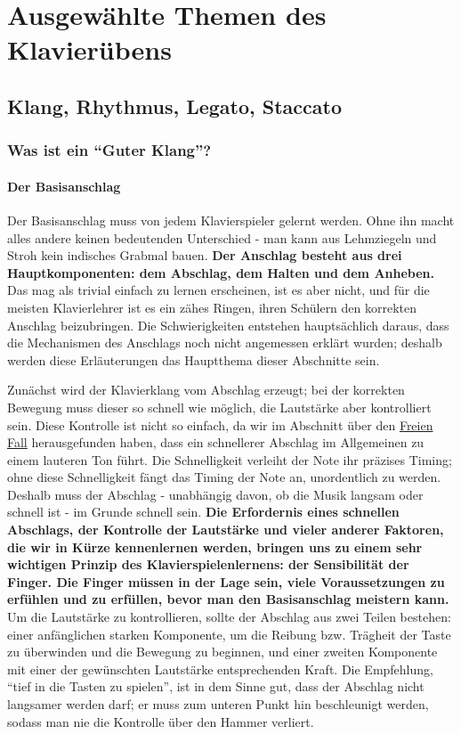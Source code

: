 
\chapter{Ausgewählte Themen des Klavierübens}
\label{c1iii1}


\section{Klang, Rhythmus, Legato, Staccato}

\subsection{Was ist ein \enquote{Guter Klang}?}
\label{c1iii1a}

\subsubsection{Der Basisanschlag}
\label{c1iii1a1}

Der Basisanschlag muss von jedem Klavierspieler gelernt werden.
Ohne ihn macht alles andere keinen bedeutenden Unterschied - man kann aus Lehmziegeln und Stroh kein indisches Grabmal bauen.
\textbf{Der Anschlag besteht aus drei Hauptkomponenten: dem Abschlag, dem Halten und dem Anheben.}
Das mag als trivial einfach zu lernen erscheinen, ist es aber nicht, und für die meisten Klavierlehrer ist es ein zähes Ringen, ihren Schülern den korrekten Anschlag beizubringen.
Die Schwierigkeiten entstehen hauptsächlich daraus, dass die Mechanismen des Anschlags noch nicht angemessen erklärt wurden; deshalb werden diese Erläuterungen das Hauptthema dieser Abschnitte sein.

Zunächst wird der Klavierklang vom Abschlag erzeugt; bei der korrekten Bewegung muss dieser so schnell wie möglich, die Lautstärke aber kontrolliert sein.
Diese Kontrolle ist nicht so einfach, da wir im Abschnitt über den \hyperref[c1ii10]{Freien Fall} herausgefunden haben, dass ein schnellerer Abschlag im Allgemeinen zu einem lauteren Ton führt.
Die Schnelligkeit verleiht der Note ihr präzises Timing; ohne diese Schnelligkeit fängt das Timing der Note an, unordentlich zu werden.
Deshalb muss der Abschlag - unabhängig davon, ob die Musik langsam oder schnell ist - im Grunde schnell sein.
\textbf{Die Erfordernis eines schnellen Abschlags, der Kontrolle der Lautstärke und vieler anderer Faktoren, die wir in Kürze kennenlernen werden, bringen uns zu einem sehr wichtigen Prinzip des Klavierspielenlernens: der Sensibilität der Finger.
Die Finger müssen in der Lage sein, viele Voraussetzungen zu erfühlen und zu erfüllen, bevor man den Basisanschlag meistern kann.}
Um die Lautstärke zu kontrollieren, sollte der Abschlag aus zwei Teilen bestehen: einer anfänglichen starken Komponente, um die Reibung bzw. Trägheit der Taste zu überwinden und die Bewegung zu beginnen, und einer zweiten Komponente mit einer der gewünschten Lautstärke entsprechenden Kraft.
Die Empfehlung, \enquote{tief in die Tasten zu spielen}, ist in dem Sinne gut, dass der Abschlag nicht langsamer werden darf; er muss zum unteren Punkt hin beschleunigt werden, sodass man nie die Kontrolle über den Hammer verliert.

